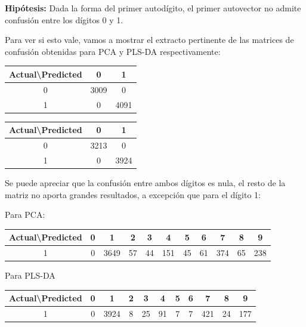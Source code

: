 \textbf{Hip\'otesis:} Dada la forma del primer autod\'igito, el primer autovector no admite confusi\'on entre los d\'igitos 0 y 1.

Para ver si esto vale, vamos a mostrar el extracto pertinente de las matrices de confusi\'on obtenidas para PCA y PLS-DA respectivamente:

\begin{table}[h!]
\begin{subtable}{.5\linewidth}
\begin{tabular}{|c|c|c|}
	\hline
	Actual\textbackslash Predicted & 0 & 1 \\
	\hline
	0 & 3009 & 0 \\
	\hline
	1 & 0 & 4091 \\
	\hline
\end{tabular}
\end{subtable}
\begin{subtable}{.5\linewidth}
\begin{tabular}{|c|c|c|}
	\hline
	Actual\textbackslash Predicted & 0 & 1 \\
	\hline
	0 & 3213 & 0 \\
	\hline
	1 & 0 & 3924 \\
	\hline
\end{tabular}
\end{subtable}
\end{table}

Se puede apreciar que la confusi\'on entre ambos d\'igitos es nula, el resto de la matriz no aporta grandes resultados, a excepci\'on que para el d\'igito 1:

Para PCA:

\begin{table}[h!]
\begin{tabular}{|c|c|c|c|c|c|c|c|c|c|c|}
	\hline
	Actual\textbackslash Predicted & 0 & 1 & 2 & 3 & 4 & 5 & 6 & 7 & 8 & 9 \\
	\hline
	1 & 0 & 3649 & 57 & 44 & 151 & 45 & 61 & 374 & 65 & 238 \\
	\hline
\end{tabular}
\end{table}

Para PLS-DA

\begin{table}[h!]
\begin{tabular}{|c|c|c|c|c|c|c|c|c|c|c|}
	\hline
	Actual\textbackslash Predicted & 0 & 1 & 2 & 3 & 4 & 5 & 6 & 7 & 8 & 9 \\
	\hline
	1 & 0 & 3924 & 8 & 25 & 91 & 7 & 7 & 421 & 24 & 177 \\
	\hline
\end{tabular}
\end{table}

